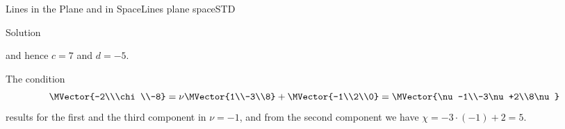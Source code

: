 \begin{MXContent}{Lines in the Plane and in Space}{Lines plane space}{STD}
\begin{MExercise}
\begin{MHint}{Solution}
\begin{MExerciseItems}
{\[\]
and hence $c=7$ and $d=-5$.
}
\item{
The condition  
\[
 \MVector{-2\\\chi\\-8} = \nu\MVector{1\\-3\\8}+\MVector{-1\\2\\0} = \MVector{\nu-1\\-3\nu+2\\8\nu}
\]
results for the first and the third component in $\nu=-1$, and from the second component we have  $\chi=-3\cdot(-1)+2=5$.
}
\end{MExerciseItems}
\end{MHint}

\end{MExercise}

\end{MXContent}




